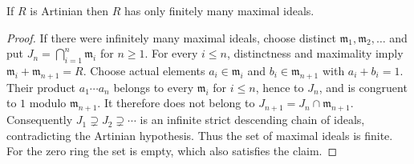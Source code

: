 \begin{lemma}
\label{editorial-source-lemma-artinian-finite-nr-max}
If $R$ is Artinian then $R$ has only finitely many maximal ideals.
\end{lemma}

\begin{proof}
If there were infinitely many maximal ideals, choose distinct
$\mathfrak m_1,\mathfrak m_2,\ldots$ and put
$J_n=\bigcap_{i=1}^n\mathfrak m_i$ for $n\geq1$.
For every $i\leq n$, distinctness and maximality imply
$\mathfrak m_i+\mathfrak m_{n+1}=R$. Choose actual elements
$a_i\in\mathfrak m_i$ and $b_i\in\mathfrak m_{n+1}$ with
$a_i+b_i=1$. Their product
$a_1\cdots a_n$ belongs to every $\mathfrak m_i$ for
$i\leq n$, hence to $J_n$, and is congruent to $1$ modulo
$\mathfrak m_{n+1}$. It therefore does not belong to
$J_{n+1}=J_n\cap\mathfrak m_{n+1}$.
Consequently $J_1\supsetneq J_2\supsetneq\cdots$ is an
infinite strict descending chain of ideals, contradicting the
Artinian hypothesis. Thus the set of maximal ideals is finite.
For the zero ring the set is empty, which also satisfies the claim.
\end{proof}